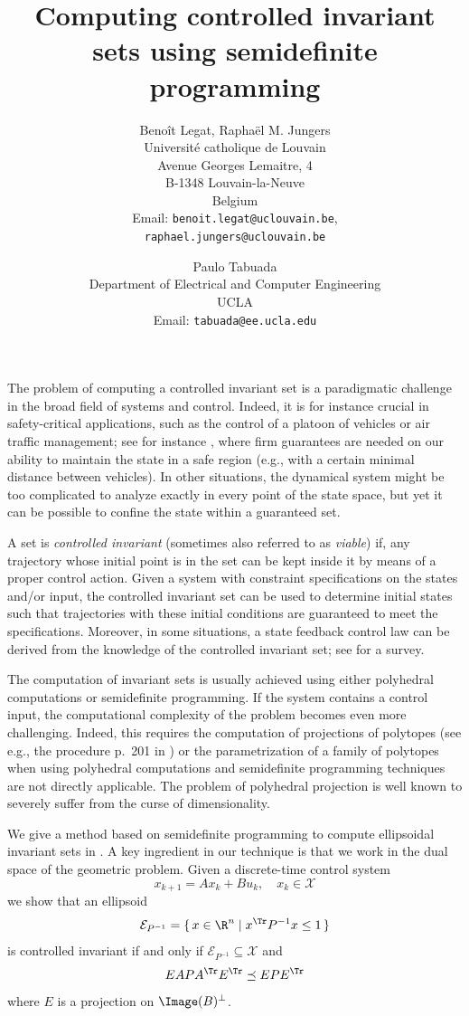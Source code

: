 \documentclass{blux}
\title{Computing controlled invariant sets using semidefinite programming}
\author{Beno\^it Legat, Rapha\"el M. Jungers\\
        Universit\'e catholique de Louvain\\
        Avenue Georges Lemaitre, 4\\
        B-1348 Louvain-la-Neuve\\
        Belgium\\
    Email: {\tt benoit.legat@uclouvain.be},\\
           {\tt raphael.jungers@uclouvain.be}
        \and
    Paulo Tabuada\\
        Department of Electrical and Computer Engineering\\
        UCLA\\
    Email: {\tt tabuada@ee.ucla.edu}
}
\date{}
\begin{document}
\maketitle


The problem of computing a controlled invariant set is a paradigmatic challenge in the broad field of systems and control.
Indeed, it is for instance crucial in safety-critical applications,
such as the control of a platoon of vehicles or air traffic management; see for instance \cite{tomlin1998conflict},
where firm guarantees are needed on our ability to maintain the state in a safe region
(e.g., with a certain minimal distance between vehicles).
In other situations, the dynamical system might be too complicated to analyze exactly in every point of the state space,
but yet it can be possible to confine the state within a guaranteed set.


A set is \emph{controlled invariant} (sometimes also referred to as \emph{viable})
if, any trajectory whose initial point is in the set can be kept inside it by means of a proper control action.
Given a system with constraint specifications on the states and/or input, the controlled invariant set can be used
to determine initial states such that trajectories with these initial conditions are guaranteed to meet the specifications.
Moreover, in some situations, a state feedback control law can be derived from the knowledge of the controlled invariant set; see \cite{blanchini1999survey} for a survey.

The computation of invariant sets is usually achieved using either polyhedral computations or semidefinite programming.
If the system contains a control input, the computational complexity of the problem becomes even more challenging.
Indeed, this requires the computation of projections of polytopes (see e.g., the procedure p.~201 in \cite{blanchini2015set}) or the parametrization of a family of polytopes \cite{rakovic2010parameterized} when using polyhedral computations
and semidefinite programming techniques are not directly applicable.
The problem of polyhedral projection is well known to severely suffer from the curse of dimensionality. %



We give a method based on semidefinite programming to compute ellipsoidal invariant sets in \cite{legat2018computing}.
A key ingredient in our technique is that we work in the dual space of the geometric problem.
Given a discrete-time control system
\[ x_{k+1} = A x_k + B u_k, \quad x_k \in \mathcal{X} \]
we show that an ellipsoid
\[ \mathcal{E}_{P^{-1}} = \{\, x \in \R^n \mid x^\Tr P^{-1} x \leq 1 \,\} \]
is controlled invariant if and only if $\mathcal{E}_{P^{-1}} \subseteq \mathcal{X}$ and
\[ E A P A^\Tr E^\Tr \preceq E P E^\Tr \]
where $E$ is a projection on $\Image(B)^{\perp}$.
\end{document}
